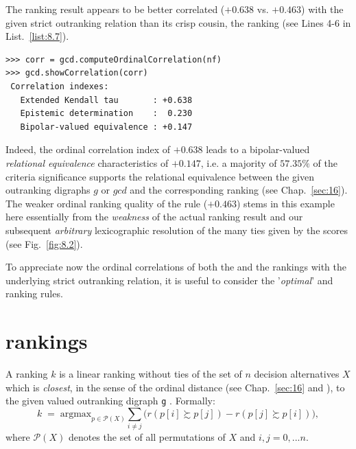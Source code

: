 The \NetFlows ranking result appears to be better correlated ($+0.638$ vs. $+0.463$) with the given strict outranking relation than its crisp cousin, the \Copeland ranking (see Lines 4-6 in List.~\vref{list:8.7}).
\begin{lstlisting}[caption={Checking the quality of the \NetFlows Ranking},label=list:8.7]   
>>> corr = gcd.computeOrdinalCorrelation(nf)
>>> gcd.showCorrelation(corr)
 Correlation indexes:
   Extended Kendall tau       : +0.638
   Epistemic determination    :  0.230
   Bipolar-valued equivalence : +0.147
\end{lstlisting}

Indeed, the ordinal correlation index of $+0.638$ leads to a bipolar-valued \emph{relational equivalence} characteristics of $+0.147$, i.e. a majority of $57.35\%$ of the criteria significance supports the relational equivalence between the given outranking digraphs $g$ or $gcd$  and the corresponding \NetFlows ranking (see Chap.~\ref{sec:16}). The weaker ordinal ranking quality of the \Copeland rule ($+0.463$) stems in this example here essentially from the \emph{weakness} of the actual \Copeland ranking result and our subsequent \emph{arbitrary} lexicographic resolution of the many ties given by the \Copeland scores (see Fig.~\vref{fig:8.2}).

To appreciate now the ordinal correlations of both the \Copeland and the \NetFlows rankings with the underlying strict outranking relation, it is useful to consider the '\emph{optimal}' \Kemeny and \Slater ranking rules.

\section{\Kemeny rankings}
\label{sec:8.4}

\begin{definition}\label{def:8.3}

  \noindent A \Kemeny ranking $k$ is a linear ranking without ties of the set of $n$ decision alternatives $X$ which is \emph{closest}, in the sense of the ordinal \Kendall distance (see Chap.~\ref{sec:16} and \citealp{BIS-2012a}), to the given valued outranking digraph \texttt{g} \citep{KEM-1959}. Formally:
  \begin{equation}\label{eq:8.1}
    k \;=\; \text{argmax}_{p \in \mathcal{P}(X)} \sum_{i \neq j}\big(r(p[i] \succsim p[j]) - r(p[j] \succsim p[i]) \big),
  \end{equation}
where $\mathcal{P}(X)$ denotes the set of all permutations of $X$ and $i,j = 0,... n$.
\end{definition}

